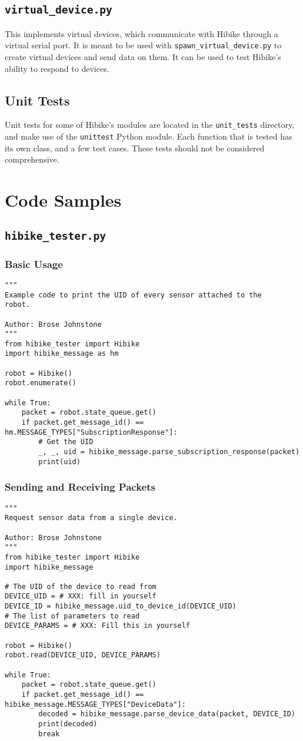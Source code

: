 \documentclass[12pt]{book}
\begin{document}
\subsection{\texttt{virtual\_device.py}}
This implements virtual devices, which communicate with Hibike
through a virtual serial port. It is meant to be used with
\texttt{spawn\_virtual\_device.py} to create virtual devices
and send data on them. It can be used to test Hibike's ability to
respond to devices.
\subsection{Unit Tests}
Unit tests for some of Hibike's modules are located in the
\texttt{unit\_tests} directory, and make use of the
\texttt{unittest} Python module. Each function that
is tested has its own class, and a few test cases. These tests
should not be considered comprehensive.

\section{Code Samples}
\subsection{\texttt{hibike\_tester.py}}
\subsubsection{Basic Usage}
\begin{verbatim}
"""
Example code to print the UID of every sensor attached to the
robot.

Author: Brose Johnstone
"""
from hibike_tester import Hibike
import hibike_message as hm

robot = Hibike()
robot.enumerate()

while True:
    packet = robot.state_queue.get()
    if packet.get_message_id() == hm.MESSAGE_TYPES["SubscriptionResponse"]:
        # Get the UID
        _, _, uid = hibike_message.parse_subscription_response(packet)
        print(uid)
\end{verbatim}

\subsubsection{Sending and Receiving Packets}
\begin{verbatim}
"""
Request sensor data from a single device.

Author: Brose Johnstone
"""
from hibike_tester import Hibike
import hibike_message

# The UID of the device to read from
DEVICE_UID = # XXX: fill in yourself
DEVICE_ID = hibike_message.uid_to_device_id(DEVICE_UID)
# The list of parameters to read
DEVICE_PARAMS = # XXX: Fill this in yourself

robot = Hibike()
robot.read(DEVICE_UID, DEVICE_PARAMS)

while True:
    packet = robot.state_queue.get()
    if packet.get_message_id() == hibike_message.MESSAGE_TYPES["DeviceData"]:
        decoded = hibike_message.parse_device_data(packet, DEVICE_ID)
        print(decoded)
        break
\end{verbatim}
\end{document}
